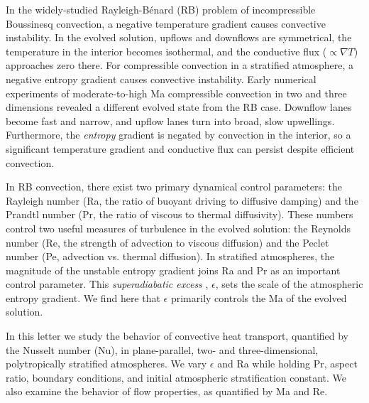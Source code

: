 \documentclass[aps, prl, twocolumn, nofootinbib, groupedaddress, amsfonts, amssymb, amsmath]{revtex4-1}
\newcommand{\grad}{\ensuremath{\nabla}}
\newcommand{\RB}{Rayleigh-B\'{e}nard }
\begin{document}
In the widely-studied \RB (RB) problem of incompressible Boussinesq convection, 
a negative temperature gradient causes convective instability.
In the evolved solution, upflows and downflows are symmetrical, the
temperature in the interior becomes isothermal, and
the conductive flux ($\propto \grad T$) approaches 
zero there. 
For compressible convection in a stratified atmosphere, a
negative entropy gradient causes convective instability.
Early numerical experiments of moderate-to-high Ma compressible convection
in two \cite{graham1975, chan&all1982,
hurlburt&all1984, cattaneo&all1990} and three 
\cite{cattaneo&all1991, brummell&all1996} dimensions
revealed a different evolved state from the RB case.
Downflow lanes
become fast and narrow, and upflow lanes turn into broad, slow upwellings.
Furthermore, the \emph{entropy} gradient is negated by convection in the interior, so
a significant temperature gradient and conductive flux can persist despite
efficient convection.

In RB convection, there exist two primary dynamical control parameters: 
the Rayleigh number (Ra, the ratio of
buoyant driving to diffusive damping) and the Prandtl number 
(Pr, the ratio of viscous to thermal
diffusivity). These numbers control two useful
measures of turbulence in the evolved solution:
the Reynolds
number (Re, the strength of advection to viscous diffusion)
and the Peclet number (Pe, advection vs. thermal diffusion).  
In stratified atmospheres, the magnitude of the unstable entropy gradient
joins Ra and Pr as an important control parameter.  This 
\emph{superadiabatic excess} \cite{graham1975}, $\epsilon$,
sets the scale of the atmospheric entropy gradient.
We find here that $\epsilon$ primarily controls the Ma of the evolved solution.

In this letter we study the behavior of convective heat transport, 
quantified by the Nusselt number (Nu), in plane-parallel, 
two- and three-dimensional, polytropically stratified atmospheres.  
We vary $\epsilon$ and Ra while holding Pr, aspect ratio, boundary conditions,
and initial atmospheric stratification
constant.  We also examine the behavior of flow properties, as quantified by Ma and Re.
\end{document}
